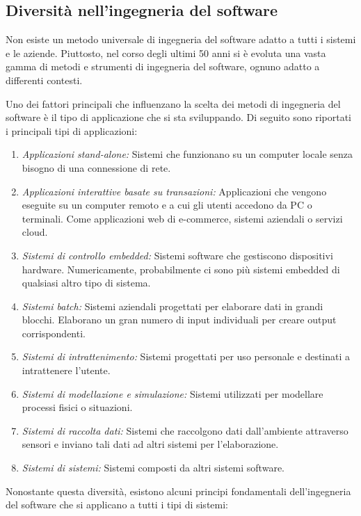 \subsection{Diversità nell'ingegneria del software}
Non esiste un metodo universale di ingegneria del software adatto a tutti i sistemi e le aziende. Piuttosto, nel corso degli ultimi 50 anni si è evoluta una vasta gamma di metodi e strumenti di ingegneria del software, ognuno adatto a differenti contesti.

Uno dei fattori principali che influenzano la scelta dei metodi di ingegneria del software è il tipo di applicazione che si sta sviluppando. Di seguito sono riportati i principali tipi di applicazioni:
\begin{enumerate}
    \item \textit{Applicazioni stand-alone:} Sistemi che funzionano su un computer locale senza bisogno di una connessione di rete.
    \item \textit{Applicazioni interattive basate su transazioni:} Applicazioni che vengono eseguite su un computer remoto e a cui gli utenti accedono da PC o terminali. Come applicazioni web di e-commerce, sistemi aziendali o servizi cloud.
    \item \textit{Sistemi di controllo embedded:} Sistemi software che gestiscono dispositivi hardware. Numericamente, probabilmente ci sono più sistemi embedded di qualsiasi altro tipo di sistema.
    \item \textit{Sistemi batch:} Sistemi aziendali progettati per elaborare dati in grandi blocchi. Elaborano un gran numero di input individuali per creare output corrispondenti.
    \item \textit{Sistemi di intrattenimento:} Sistemi progettati per uso personale e destinati a intrattenere l'utente.
    \item \textit{Sistemi di modellazione e simulazione:} Sistemi utilizzati per modellare processi fisici o situazioni.
    \item \textit{Sistemi di raccolta dati:} Sistemi che raccolgono dati dall'ambiente attraverso sensori e inviano tali dati ad altri sistemi per l'elaborazione.
    \item \textit{Sistemi di sistemi:} Sistemi composti da altri sistemi software.
\end{enumerate}
Nonostante questa diversità, esistono alcuni principi fondamentali dell'ingegneria del software che si applicano a tutti i tipi di sistemi:
